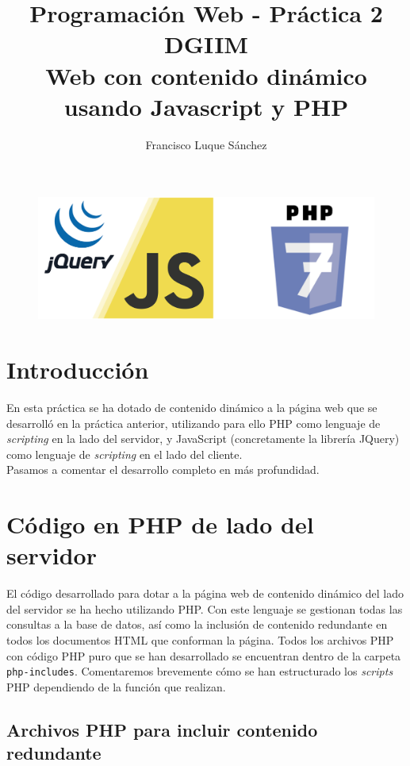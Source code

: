 \documentclass[11pt]{article}
\theoremstyle{plain}
\theoremstyle{definition}
\begin{document}
\title{Programación Web - Práctica 2\\
  DGIIM \\
  \large Web con contenido dinámico usando Javascript y PHP}
\author{Francisco Luque Sánchez}
\maketitle

\begin{figure}[H]
  \centering
  \includegraphics[width=.5\textwidth]{js_php.png}
\end{figure}


\section{Introducción}

En esta práctica se ha dotado de contenido dinámico a la página web
que se desarrolló en la práctica anterior, utilizando para ello PHP
como lenguaje de \textit{scripting} en la lado del servidor, y
JavaScript (concretamente la librería JQuery) como lenguaje
de \textit{scripting} en el lado del cliente.\\

Pasamos a comentar el desarrollo completo en más profundidad.

\section{Código en PHP de lado del servidor}

El código desarrollado para dotar a la página web de contenido
dinámico del lado del servidor se ha hecho utilizando PHP. Con este
lenguaje se gestionan todas las consultas a la base de datos, así como
la inclusión de contenido redundante en todos los documentos HTML que
conforman la página. Todos los archivos PHP con código PHP puro que se
han desarrollado se encuentran dentro de la carpeta
\texttt{php-includes}. Comentaremos brevemente cómo se han
estructurado los \textit{scripts} PHP dependiendo de la función que
realizan.

\subsection{Archivos PHP para incluir contenido redundante}
\end{document}

